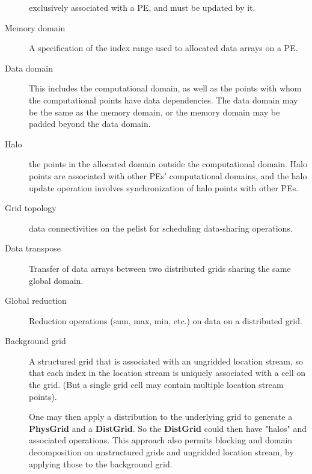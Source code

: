 \begin{description}
  exclusively associated with a PE, and must be updated by it.
\item[Memory domain] A specification of the index
  range used to allocated data arrays on a PE.
\item[Data domain] This includes the computational domain, as well as
  the points with whom the computational points have data
  dependencies. The data domain may be the same as the memory domain,
  or the memory domain may be padded beyond the data domain.
\item[Halo] the points in the allocated domain outside the
  computational domain. Halo points are associated with other PEs'
  computational domains, and the halo update operation involves
  synchronization of halo points with other PEs.
\item[Grid topology] data connectivities on the pelist for scheduling
  data-sharing operations.
\item[Data transpose] Transfer of data arrays between two distributed
  grids sharing the same global domain.
\item[Global reduction] Reduction operations (sum, max, min, etc.) on
  data on a distributed grid.
\item[Background grid] A structured grid that is associated with an
  ungridded location stream, so that each index in the location stream
  is uniquely associated with a cell on the grid. (But a single grid
  cell may contain multiple location stream points).
  
  One may then apply a distribution to the underlying grid to generate
  a \textbf{PhysGrid} and a \textbf{DistGrid}. So the \textbf{DistGrid}
  could then have "halos" and associated operations. This approach
  also permits blocking and domain decomposition on unstructured grids
  and ungridded location stream, by applying those to the background
  grid.



\end{description}



